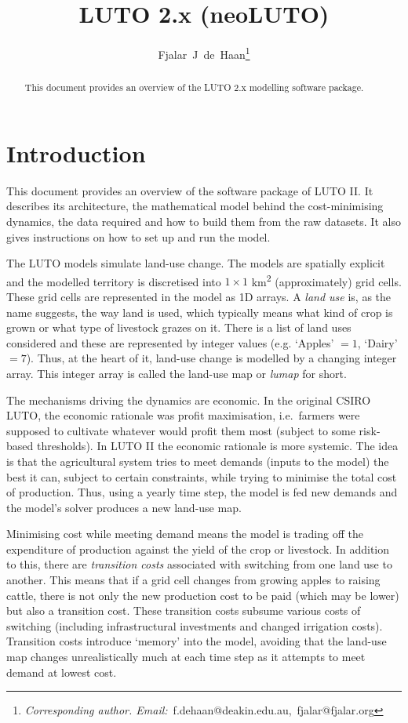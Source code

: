 \documentclass{draft}
\author[]{Fjalar~J~de~Haan\thanks{\textit{Corresponding author. Email:}~f.dehaan@deakin.edu.au,~fjalar@fjalar.org}}
\affil[]{Planet A, Centre for Integrative Ecology, \mbox{Deakin University, Australia}}
\date{}
\begin{document}
\title{LUTO 2.x (neoLUTO)}

\maketitle

\begin{abstract}
	\noindent This document provides an overview of the LUTO 2.x modelling software package.
\end{abstract}

\tableofcontents

\newpage

\section{Introduction}
This document provides an overview of the software package of LUTO II\@. It describes its architecture, the mathematical model behind the cost-minimising dynamics, the data required and how to build them from the raw datasets. It also gives instructions on how to set up and run the model.


The LUTO models simulate land-use change. The models are spatially explicit and the modelled territory is discretised into $1 \times 1$ km\textsuperscript{2} (approximately) grid cells. These grid cells are represented in the model as 1D arrays. A \emph{land use} is, as the name suggests, the way land is used, which typically means what kind of crop is grown or what type of livestock grazes on it. There is a list of land uses considered and these are represented by integer values (e.g. `Apples' $ = 1$, `Dairy' $ = 7$). Thus, at the heart of it, land-use change is modelled by a changing integer array. This integer array is called the land-use map or \emph{lumap} for short.

The mechanisms driving the dynamics are economic. In the original CSIRO LUTO, the economic rationale was profit maximisation, i.e.\ farmers were supposed to cultivate whatever would profit them most (subject to some risk-based thresholds). In LUTO II the economic rationale is more systemic. The idea is that the agricultural system tries to meet demands (inputs to the model) the best it can, subject to certain constraints, while trying to minimise the total cost of production. Thus, using a yearly time step, the model is fed new demands and the model's solver produces a new land-use map.

Minimising cost while meeting demand means the model is trading off the expenditure of production against the yield of the crop or livestock. In addition to this, there are \emph{transition costs} associated with switching from one land use to another. This means that if a grid cell changes from growing apples to raising cattle, there is not only the new production cost to be paid (which may be lower) but also a transition cost. These transition costs subsume various costs of switching (including infrastructural investments and changed irrigation costs). Transition costs introduce `memory' into the model, avoiding that the land-use map changes unrealistically much at each time step as it attempts to meet demand at lowest cost.
\end{document}
